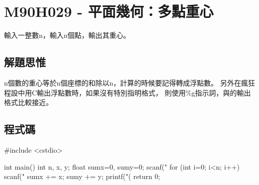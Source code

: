 \section{M90H029 - 平面幾何：多點重心}
輸入一整數n，輸入n個點，輸出其重心。
\subsection{解題思惟}
n個數的重心等於n個座標的和除以n，計算的時候要記得轉成浮點數。
另外在瘋狂程設中用C輸出浮點數時，如果沒有特別指明格式，
則使用\%g指示詞，與\cc{}的輸出格式比較接近。
\subsection{程式碼}
\begin{cppcode}
#include <cstdio>

int main()
{
	int n, x, y;
	float sumx=0, sumy=0;
	scanf("%
	for (int i=0; i<n; i++) {
		scanf("%
		sumx += x;
		sumy += y;
	}
	printf("(%
	return 0;
}
\end{cppcode}
